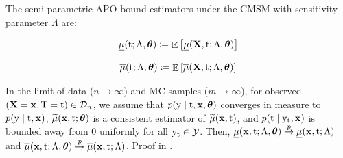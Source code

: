 The semi-parametric APO bound estimators under the CMSM with sensitivity parameter $\Lambda$ are:
\noindent
\begin{minipage}{.5\linewidth}
    \begin{equation}
        \label{eq:APO_lower_param}
        \underline{\mu}(\mathrm{t}; \Lambda, \bm{\theta}) \coloneqq \mathop{\mathbb{E}}\left[ \underline{\mu}(\mathbf{X}, \mathrm{t}; \Lambda, \bm{\theta}) \right]
    \end{equation}
\end{minipage}%
\begin{minipage}{.5\linewidth}
    \begin{equation}
        \label{eq:APO_upper_param}
        \overline{\mu}(\mathrm{t}; \Lambda, \bm{\theta}) \coloneqq \mathop{\mathbb{E}}\left[ \overline{\mu}(\mathbf{X}, \mathrm{t}; \Lambda, \bm{\theta}) \right]
    \end{equation}
\end{minipage}
\begin{theorem}
    \label{th:sharpness}
    In the limit of data ($n \to \infty$) and MC samples ($m \to \infty$), for observed $(\mathbf{X}=\mathbf{x}, \mathrm{T}=\mathrm{t}) \in \mathcal{D}_n$, we assume that $p(\mathrm{y} \mid \mathrm{t}, \mathbf{x}, \bm{\theta})$ converges in measure to $p(\mathrm{y} \mid \mathrm{t}, \mathbf{x})$, $\widetilde{\mu}(\mathbf{x}, \mathrm{t}; \bm{\theta})$ is a consistent estimator of $\widetilde{\mu}(\mathbf{x}, \mathrm{t})$, and $p(\mathrm{t} \mid \mathrm{y}_{\mathrm{t}}, \mathbf{x})$ is bounded away from 0 uniformly for all $\mathrm{y}_{\mathrm{t}} \in \mathcal{Y}$. Then, $\underline{\mu}(\mathbf{x}, \mathrm{t}; \Lambda, \bm{\theta}) \overset{p}{\to} \underline{\mu}(\mathbf{x}, \mathrm{t}; \Lambda)$ and $\overline{\mu}(\mathbf{x}, \mathrm{t}; \Lambda, \bm{\theta}) \overset{p}{\to} \overline{\mu}(\mathbf{x}, \mathrm{t}; \Lambda)$. Proof in .
\end{theorem}

